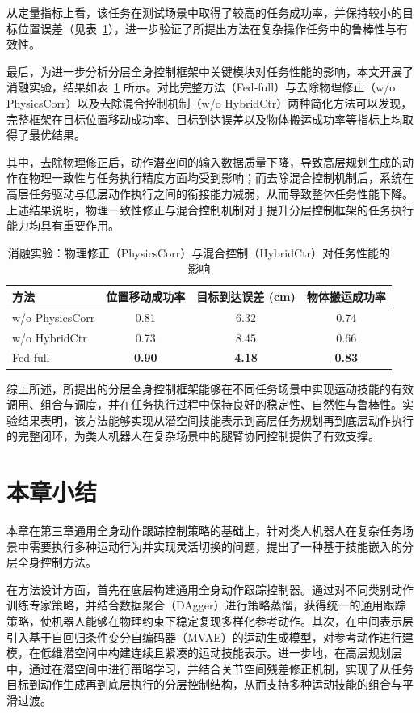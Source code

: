 从定量指标上看，该任务在测试场景中取得了较高的任务成功率，并保持较小的目标位置误差（见表~\ref{tab:task_performance}），进一步验证了所提出方法在复杂操作任务中的鲁棒性与有效性。

最后，为进一步分析分层全身控制框架中关键模块对任务性能的影响，本文开展了消融实验，结果如表~\ref{tab:task_performance} 所示。对比完整方法（Fed-full）与去除物理修正（w/o PhysicsCorr）以及去除混合控制机制（w/o HybridCtr）两种简化方法可以发现，完整框架在目标位置移动成功率、目标到达误差以及物体搬运成功率等指标上均取得了最优结果。

其中，去除物理修正后，动作潜空间的输入数据质量下降，导致高层规划生成的动作在物理一致性与任务执行精度方面均受到影响；而去除混合控制机制后，系统在高层任务驱动与低层动作执行之间的衔接能力减弱，从而导致整体任务性能下降。上述结果说明，物理一致性修正与混合控制机制对于提升分层控制框架的任务执行能力均具有重要作用。

\begin{table}[htbp]
	\centering
	\caption{消融实验：物理修正（PhysicsCorr）与混合控制（HybridCtr）对任务性能的影响}
	\label{tab:task_performance}
	\begin{tabular}{lccc}
		\toprule
		方法 & 位置移动成功率 & 目标到达误差 (cm) & 物体搬运成功率 \\
		\midrule
		w/o PhysicsCorr & 0.81 & 6.32 & 0.74 \\
		w/o HybridCtr & 0.73 & 8.45 & 0.66 \\
		Fed-full & \textbf{0.90} & \textbf{4.18} & \textbf{0.83} \\
		\bottomrule
	\end{tabular}
\end{table}

综上所述，所提出的分层全身控制框架能够在不同任务场景中实现运动技能的有效调用、组合与调度，并在任务执行过程中保持良好的稳定性、自然性与鲁棒性。实验结果表明，该方法能够实现从潜空间技能表示到高层任务规划再到底层动作执行的完整闭环，为类人机器人在复杂场景中的腿臂协同控制提供了有效支撑。




\section{本章小结}

本章在第三章通用全身动作跟踪控制策略的基础上，针对类人机器人在复杂任务场景中需要执行多种运动行为并实现灵活切换的问题，提出了一种基于技能嵌入的分层全身控制方法。

在方法设计方面，首先在底层构建通用全身动作跟踪控制器。通过对不同类别动作训练专家策略，并结合数据聚合（DAgger）进行策略蒸馏，获得统一的通用跟踪策略，使机器人能够在物理约束下稳定复现多样化参考动作。其次，在中间表示层引入基于自回归条件变分自编码器（MVAE）的运动生成模型，对参考动作进行建模，在低维潜空间中构建连续且紧凑的运动技能表示。进一步地，在高层规划层中，通过在潜空间中进行策略学习，并结合关节空间残差修正机制，实现了从任务目标到动作生成再到底层执行的分层控制结构，从而支持多种运动技能的组合与平滑过渡。

